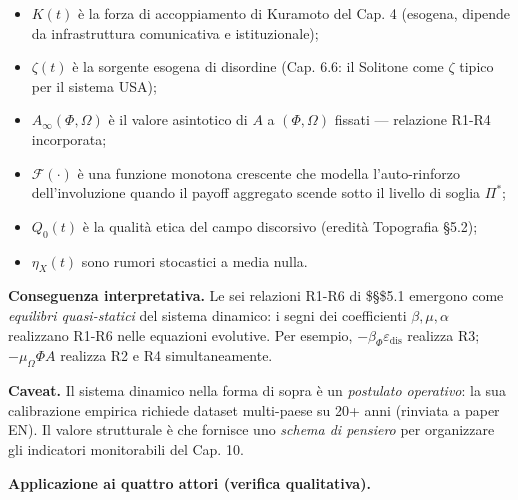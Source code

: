\begin{itemize}
\tightlist
\item
  \(K(t)\) è la forza di accoppiamento di Kuramoto del Cap. 4 (esogena,
  dipende da infrastruttura comunicativa e istituzionale);
\item
  \(\zeta(t)\) è la sorgente esogena di disordine (Cap. 6.6: il Solitone
  come \(\zeta\) tipico per il sistema USA);
\item
  \(A_\infty(\Phi, \Omega)\) è il valore asintotico di \(A\) a
  \((\Phi, \Omega)\) fissati --- relazione R1-R4 incorporata;
\item
  \(\mathcal{F}(\cdot)\) è una funzione monotona crescente che modella
  l'auto-rinforzo dell'involuzione quando il payoff aggregato scende
  sotto il livello di soglia \(\Pi^*\);
\item
  \(Q_0(t)\) è la qualità etica del campo discorsivo (eredità Topografia
  \S{}5.2);
\item
  \(\eta_X(t)\) sono rumori stocastici a media nulla.
\end{itemize}

\Proved{} \textbf{Conseguenza interpretativa.} Le sei relazioni R1-R6 di
\$\S\$5.1 emergono come \emph{equilibri quasi-statici} del sistema
dinamico: i segni dei coefficienti \(\beta, \mu, \alpha\) realizzano
R1-R6 nelle equazioni evolutive. Per esempio,
\(-\beta_\Phi \varepsilon_{\text{dis}}\) realizza R3;
\(-\mu_\Omega \Phi A\) realizza R2 e R4 simultaneamente.

\Conj{} \textbf{Caveat.} Il sistema dinamico nella forma di sopra è un
\emph{postulato operativo}: la sua calibrazione empirica richiede
dataset multi-paese su 20+ anni (rinviata a paper EN). Il valore
strutturale è che fornisce uno \emph{schema di pensiero} per organizzare
gli indicatori monitorabili del Cap. 10.

\Hypoth{} \textbf{Applicazione ai quattro attori (verifica
qualitativa).}

